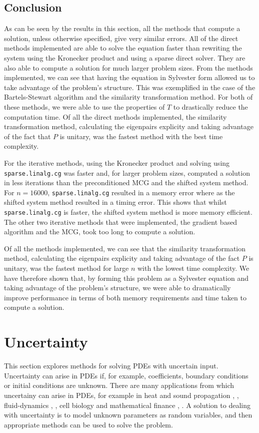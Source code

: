 \documentclass[11pt]{article}
\numberwithin{equation}{section}
\begin{document}
\subsection{Conclusion}
As can be seen by the results in this section, all the methods that compute a solution, unless otherwise specified, give very similar errors. All of the direct methods implemented are able to solve the equation faster than rewriting the system using the Kronecker product and using a sparse direct solver. They are also able to compute a solution for much larger problem sizes. From the methods implemented, we can see that having the equation in Sylvester form allowed us to take advantage of the problem's structure. This was exemplified in the case of the Bartels-Stewart algorithm and the similarity transformation method. For both of these methods, we were able to use the properties of $T$ to drastically reduce the computation time. Of all the direct methods implemented, the similarity transformation method, calculating the eigenpairs explicity and taking advantage of the fact that $P$ is unitary, was the fastest method with the best time complexity. 

For the iterative methods, using the Kronecker product and solving using \texttt{sparse.linalg.cg} was faster and, for larger problem sizes, computed a solution in less iterations than the preconditioned MCG and the shifted system method. For $n=16000$, \texttt{sparse.linalg.cg} resulted in a memory error where as the shifted system method resulted in a timing error. This shows that whilst \texttt{sparse.linalg.cg} is faster, the shifted system method is more memory efficient. The other two iterative methods that were implemented, the gradient based algorithm and the MCG, took too long to compute a solution. 

Of all the methods implemented, we can see that the similarity transformation method, calculating the eigenpairs explicity and taking advantage of the fact $P$ is unitary, was the fastest method for large $n$ with the lowest time complexity. We have therefore shown that, by forming this problem as a Sylvester equation and taking advantage of the problem's structure, we were able to dramatically improve performance in terms of both memory requirements and time taken to compute a solution.

\newpage

\section{Uncertainty}
This section explores methods for solving PDEs with uncertain input. Uncertainty can arise in PDEs if, for example, coefficients, boundary conditions or initial conditions are unknown. There are many applications from which uncertainy can arise in PDEs, for example in heat and sound propagation \cite{Swanson}, \cite{Pryhara}, fluid-dynamics \cite{Breit}, \cite{Holm}, cell biology \cite{Bressloff} and mathematical finance \cite{Shreve03}, \cite{Shreve04}. A solution to dealing with uncertainty is to model unknown parameters as random variables, and then appropriate methods can be used to solve the problem. 
\end{document}
